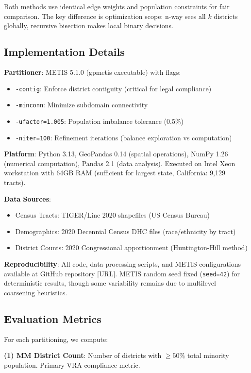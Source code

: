 Both methods use identical edge weights and population constraints for fair comparison. The key difference is optimization scope: n-way sees all $k$ districts globally, recursive bisection makes local binary decisions.

\subsection{Implementation Details}

\textbf{Partitioner}: METIS 5.1.0 (gpmetis executable) with flags:
\begin{itemize}
\item \texttt{-contig}: Enforce district contiguity (critical for legal compliance)
\item \texttt{-minconn}: Minimize subdomain connectivity
\item \texttt{-ufactor=1.005}: Population imbalance tolerance (0.5\%)
\item \texttt{-niter=100}: Refinement iterations (balance exploration vs computation)
\end{itemize}

\textbf{Platform}: Python 3.13, GeoPandas 0.14 (spatial operations), NumPy 1.26 (numerical computation), Pandas 2.1 (data analysis). Executed on Intel Xeon workstation with 64GB RAM (sufficient for largest state, California: 9,129 tracts).

\textbf{Data Sources}:
\begin{itemize}
\item Census Tracts: TIGER/Line 2020 shapefiles (US Census Bureau)
\item Demographics: 2020 Decennial Census DHC files (race/ethnicity by tract)
\item District Counts: 2020 Congressional apportionment (Huntington-Hill method)
\end{itemize}

\textbf{Reproducibility}: All code, data processing scripts, and METIS configurations available at GitHub repository [URL]. METIS random seed fixed (\texttt{seed=42}) for deterministic results, though some variability remains due to multilevel coarsening heuristics.

\subsection{Evaluation Metrics}

For each partitioning, we compute:

\textbf{(1) MM District Count}: Number of districts with $\geq 50\%$ total minority population. Primary VRA compliance metric.

